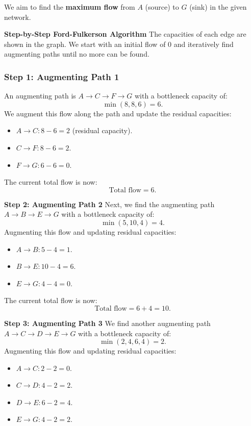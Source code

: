 \documentclass{beamer}
\begin{document}
\begin{frame}[allowframebreaks]


We aim to find the \textbf{maximum flow} from \( A \) (source) to \( G \) (sink) in the given network.

\textbf{Step-by-Step Ford-Fulkerson Algorithm}
The capacities of each edge are shown in the graph. We start with an initial flow of 0 and iteratively find augmenting paths until no more can be found.

\subsubsection*{Step 1: Augmenting Path 1}
An augmenting path is \( A \to C \to F \to G \) with a bottleneck capacity of:
\[
\min(8, 8, 6) = 6.
\]
We augment this flow along the path and update the residual capacities:

\begin{itemize}
    \item \( A \to C: 8 - 6 = 2 \) (residual capacity).
    \item \( C \to F: 8 - 6 = 2 \).
    \item \( F \to G: 6 - 6 = 0 \).
\end{itemize}

The current total flow is now:
\[
\text{Total flow} = 6.
\]

\textbf{Step 2: Augmenting Path 2}
Next, we find the augmenting path \( A \to B \to E \to G \) with a bottleneck capacity of:
\[
\min(5, 10, 4) = 4.
\]
Augmenting this flow and updating residual capacities:
\begin{itemize}
    \item \( A \to B: 5 - 4 = 1 \).
    \item \( B \to E: 10 - 4 = 6 \).
    \item \( E \to G: 4 - 4 = 0 \).
\end{itemize}

The current total flow is now:
\[
\text{Total flow} = 6 + 4 = 10.
\]

\textbf{Step 3: Augmenting Path 3}
We find another augmenting path \( A \to C \to D \to E \to G \) with a bottleneck capacity of:
\[
\min(2, 4, 6, 4) = 2.
\]
Augmenting this flow and updating residual capacities:
\begin{itemize}
    \item \( A \to C: 2 - 2 = 0 \).
    \item \( C \to D: 4 - 2 = 2 \).
    \item \( D \to E: 6 - 2 = 4 \).
    \item \( E \to G: 4 - 2 = 2 \).
\end{itemize}


\end{frame}
\end{document}
